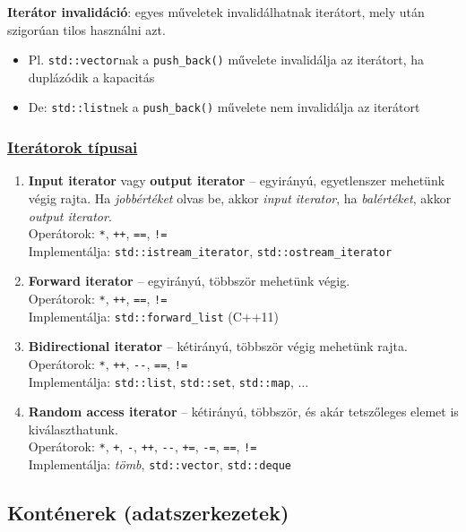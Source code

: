 \documentclass[a4paper, 11pt, oneside]{book}
\begin{document}
\textbf{Iterátor invalidáció}: egyes műveletek invalidálhatnak iterátort, mely után szigorúan tilos használni azt.
\begin{itemize}
	\item Pl. \verb*|std::vector|nak a \verb*|push_back()| művelete invalidálja az iterátort, ha duplázódik a kapacitás
	\item De: \verb*|std::list|nek a \verb*|push_back()| művelete nem invalidálja az iterátort
\end{itemize}

\subsubsection{\underline{Iterátorok típusai}}

\begin{enumerate}
	\item \textbf{Input iterator} vagy \textbf{output iterator} -- egyirányú, egyetlenszer mehetünk végig rajta. Ha \textit{jobbértéket} olvas be, akkor \textit{input iterator}, ha \textit{balértéket}, akkor \textit{output iterator}. \\ Operátorok: \verb*|*|, \verb*|++|, \verb*|==|, \verb*|!=| \\ Implementálja: \verb*|std::istream_iterator|, \verb*|std::ostream_iterator|
	\item \textbf{Forward iterator} -- egyirányú, többször mehetünk végig. \\ Operátorok: \verb*|*|, \verb*|++|, \verb*|==|, \verb*|!=| \\ Implementálja: \verb*|std::forward_list| (C++11)
	\item \textbf{Bidirectional iterator} -- kétirányú, többször végig mehetünk rajta. \\ Operátorok: \verb*|*|, \verb*|++|, \verb*|--|, \verb*|==|, \verb*|!=| \\ Implementálja: \verb*|std::list|, \verb*|std::set|, \verb*|std::map|, $\ldots$
	\item \textbf{Random access iterator} -- kétirányú, többször, és akár tetszőleges elemet is kiválaszthatunk. \\ Operátorok: \verb*|*|, \verb*|+|, \verb*|-|, \verb*|++|, \verb*|--|, \verb*|+=|, \verb*|-=|, \verb*|==|, \verb*|!=| \\ Implementálja: \textit{tömb}, \verb*|std::vector|, \verb*|std::deque|
\end{enumerate}

\clearpage

\subsection{Konténerek (adatszerkezetek)}
\end{document}

